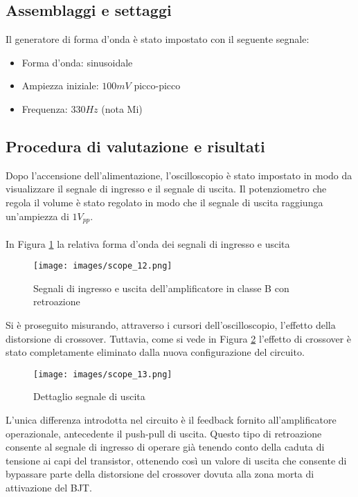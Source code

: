 \subsection{Assemblaggi e settaggi}
Il generatore di forma d'onda è stato impostato con il seguente segnale:
\begin{itemize}
    \item Forma d'onda: sinusoidale
    \item Ampiezza iniziale: $100mV$ picco-picco
    \item Frequenza: $330Hz$ (nota Mi)
\end{itemize}
\subsection{Procedura di valutazione e risultati}
Dopo l'accensione dell'alimentazione, l'oscilloscopio è stato impostato in modo da visualizzare il segnale di ingresso e il segnale di uscita. Il potenziometro che regola il volume è stato regolato in modo che il segnale di uscita raggiunga un'ampiezza di $1V_{pp}$.\\\\
In Figura \ref{fig:scope_12} la relativa forma d'onda dei segnali di ingresso e uscita
\begin{figure}[H]
    \centering
    \texttt{[image: images/scope\_12.png]}
    \caption{Segnali di ingresso e uscita dell'amplificatore in classe B con retroazione}
    \label{fig:scope_12}
\end{figure}
Si è proseguito misurando, attraverso i cursori dell’oscilloscopio, l’effetto della distorsione di crossover. Tuttavia, come si vede in Figura \ref{fig:scope_13} l'effetto di crossover è stato completamente eliminato dalla nuova configurazione del circuito.
\begin{figure}[H]
    \centering
    \texttt{[image: images/scope\_13.png]}
    \caption{Dettaglio segnale di uscita}
    \label{fig:scope_13}
\end{figure}
L’unica differenza introdotta nel circuito è il feedback fornito all’amplificatore operazionale, antecedente il push-pull di uscita. Questo tipo di retroazione consente al segnale di ingresso di operare già tenendo conto della caduta di tensione ai capi del transistor, ottenendo così un valore di uscita che consente di bypassare parte della distorsione del crossover dovuta alla zona morta di attivazione del BJT.